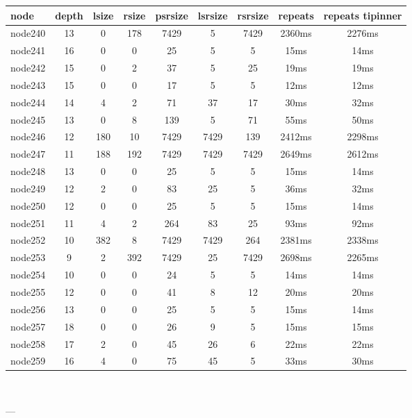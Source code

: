 \begin{tabular}{|l|c|c|c|c|c|c|c|c|}
\hline node & depth & lsize & rsize & psrsize & lsrsize & rsrsize   & repeats & repeats tipinner\\
    \hline node240 & 13 & 0 & 178 & 7429 & 5 & 7429 & 2360ms & 2276ms\\
    \hline node241 & 16 & 0 & 0 & 25 & 5 & 5 & 15ms & 14ms\\
    \hline node242 & 15 & 0 & 2 & 37 & 5 & 25 & 19ms & 19ms\\
    \hline node243 & 15 & 0 & 0 & 17 & 5 & 5 & 12ms & 12ms\\
    \hline node244 & 14 & 4 & 2 & 71 & 37 & 17 & 30ms & 32ms\\
    \hline node245 & 13 & 0 & 8 & 139 & 5 & 71 & 55ms & 50ms\\
    \hline node246 & 12 & 180 & 10 & 7429 & 7429 & 139 & 2412ms & 2298ms\\
    \hline node247 & 11 & 188 & 192 & 7429 & 7429 & 7429 & 2649ms & 2612ms\\
    \hline node248 & 13 & 0 & 0 & 25 & 5 & 5 & 15ms & 14ms\\
    \hline node249 & 12 & 2 & 0 & 83 & 25 & 5 & 36ms & 32ms\\
    \hline node250 & 12 & 0 & 0 & 25 & 5 & 5 & 15ms & 14ms\\
    \hline node251 & 11 & 4 & 2 & 264 & 83 & 25 & 93ms & 92ms\\
    \hline node252 & 10 & 382 & 8 & 7429 & 7429 & 264 & 2381ms & 2338ms\\
    \hline node253 & 9 & 2 & 392 & 7429 & 25 & 7429 & 2698ms & 2265ms\\
    \hline node254 & 10 & 0 & 0 & 24 & 5 & 5 & 14ms & 14ms\\
    \hline node255 & 12 & 0 & 0 & 41 & 8 & 12 & 20ms & 20ms\\
    \hline node256 & 13 & 0 & 0 & 25 & 5 & 5 & 15ms & 14ms\\
    \hline node257 & 18 & 0 & 0 & 26 & 9 & 5 & 15ms & 15ms\\
    \hline node258 & 17 & 2 & 0 & 45 & 26 & 6 & 22ms & 22ms\\
    \hline node259 & 16 & 4 & 0 & 75 & 45 & 5 & 33ms & 30ms\\

\hline
\end{tabular} \

---


